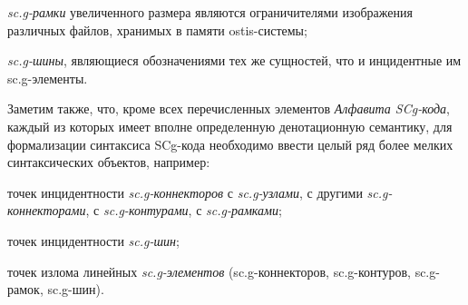 \begin{SCn}
\begin{scnstruct}
\begin{scnsubstruct}
{\begin{scnitemize}
\begin{scnitemizeii}
                        \end{scnitemizeii}
                    \item \textit{sc.g-рамки} увеличенного размера являются ограничителями изображения различных файлов, хранимых в памяти ostis-системы; 
                    \item \textit{sc.g-шины}, являющиеся обозначениями тех же сущностей, что и инцидентные им sc.g-элементы.
                \end{scnitemize}
                Заметим также, что, кроме всех перечисленных элементов \textit{Алфавита SCg-кода}, каждый из которых имеет вполне определенную денотационную  семантику, для формализации синтаксиса SCg-кода необходимо ввести целый ряд более мелких синтаксических объектов, например:
                \begin{scnitemize}
                    \item точек инцидентности \textit{sc.g-коннекторов} с \textit{sc.g-узлами}, с другими \textit{sc.g-коннекторами}, с \textit{sc.g-контурами}, с \textit{sc.g-рамками}; 
                    \item точек инцидентности \textit{sc.g-шин};
                    \item точек излома линейных \textit{sc.g-элементов} (sc.g-коннекторов, sc.g-контуров, sc.g-рамок, sc.g-шин).
                \end{scnitemize}
            }
            

\end{scnsubstruct}
\end{scnstruct}
\end{SCn}
